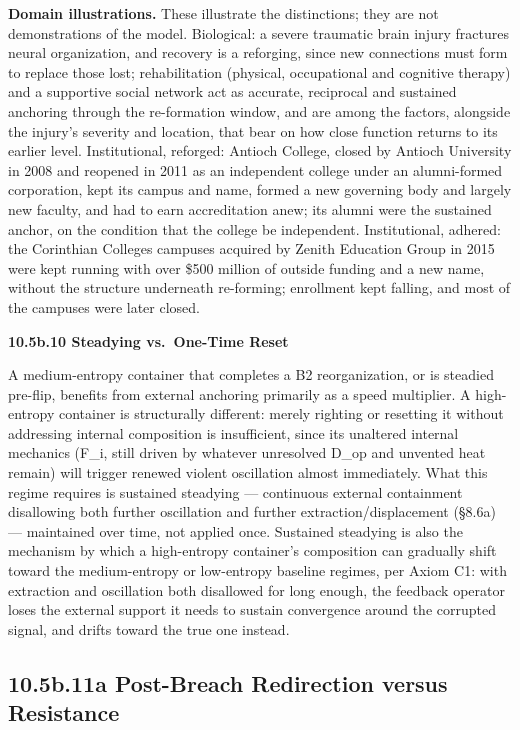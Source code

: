 \documentclass[
]{article}
\begin{document}
\textbf{Domain illustrations.} These illustrate the distinctions; they
are not demonstrations of the model. Biological: a severe traumatic
brain injury fractures neural organization, and recovery is a reforging,
since new connections must form to replace those lost; rehabilitation
(physical, occupational and cognitive therapy) and a supportive social
network act as accurate, reciprocal and sustained anchoring through the
re-formation window, and are among the factors, alongside the injury's
severity and location, that bear on how close function returns to its
earlier level. Institutional, reforged: Antioch College, closed by
Antioch University in 2008 and reopened in 2011 as an independent
college under an alumni-formed corporation, kept its campus and name,
formed a new governing body and largely new faculty, and had to earn
accreditation anew; its alumni were the sustained anchor, on the
condition that the college be independent. Institutional, adhered: the
Corinthian Colleges campuses acquired by Zenith Education Group in 2015
were kept running with over \$500 million of outside funding and a new
name, without the structure underneath re-forming; enrollment kept
falling, and most of the campuses were later closed.

\textbf{10.5b.10 Steadying vs.~One-Time Reset}

A medium-entropy container that completes a B2 reorganization, or is
steadied pre-flip, benefits from external anchoring primarily as a speed
multiplier. A high-entropy container is structurally different: merely
righting or resetting it without addressing internal composition is
insufficient, since its unaltered internal mechanics (F\_i, still driven
by whatever unresolved D\_op and unvented heat remain) will trigger
renewed violent oscillation almost immediately. What this regime
requires is sustained steadying --- continuous external containment
disallowing both further oscillation and further extraction/displacement
(§8.6a) --- maintained over time, not applied once. Sustained steadying
is also the mechanism by which a high-entropy container's composition
can gradually shift toward the medium-entropy or low-entropy baseline
regimes, per Axiom C1: with extraction and oscillation both disallowed
for long enough, the feedback operator loses the external support it
needs to sustain convergence around the corrupted signal, and drifts
toward the true one instead.

\hypertarget{b.11a-post-breach-redirection-versus-resistance}{%
\subsection{10.5b.11a Post-Breach Redirection versus
Resistance}\label{b.11a-post-breach-redirection-versus-resistance}}
\end{document}
